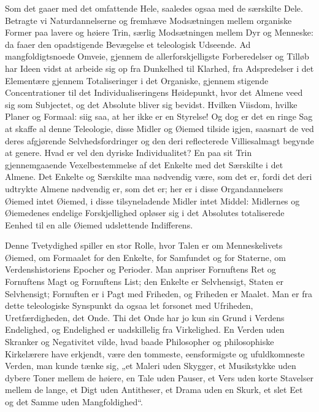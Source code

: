 \documentclass[12pt]{book}
\begin{document}
Som det gaaer med det omfattende Hele, saaledes ogsaa med de
særskilte Dele. Betragte vi Naturdannelserne og fremhæve
Modsætningen mellem organiske Former paa lavere og høiere Trin,
særlig Modsætningen mellem Dyr og Menneske: da faaer den opadstigende
Bevægelse et teleologisk Udseende. Ad mangfoldigtsnoede Omveie,
gjennem de allerforskjelligste Forberedelser og Tilløb har Ideen
vidst at arbeide sig op fra Dunkelhed til Klarhed, fra Adspredelser
i det Elementære gjennem Totaliseringer i det Organiske, gjennem
stigende Concentrationer til det Individualiseringens Høidepunkt,
hvor det Almene veed sig som Subjectet, og det Absolute bliver sig
bevidst. Hvilken Viisdom, hvilke Planer og Formaal: siig saa, at her
ikke er en Styrelse! Og dog er det en ringe Sag at skaffe al denne
Teleologie, disse Midler og Øiemed tilside igjen, saasnart de ved
deres afgjørende Selvhedsfordringer og den deri reflecterede
Villiesalmagt begynde at genere. Hvad er vel den dyriske
Individualitet? En paa sit Trin gjennemgaaende Vexelbestemmelse af
det Enkelte med det Særskilte i det Almene. Det Enkelte og Særskilte
maa nødvendig være, som det er, fordi det deri udtrykte Almene
nødvendig er, som det er; her er i disse Organdannelsers Øiemed
intet Øiemed, i disse tilsyneladende Midler intet Middel: Midlernes
og Øiemedenes endelige Forskjellighed opløser sig i det Absolutes
totaliserede Eenhed til en alle Øiemed udslettende Indifferens.

Denne Tvetydighed spiller en stor Rolle, hvor Talen er om
Menneskelivets Øiemed, om Formaalet for den
Enkelte, for Samfundet og for Staterne, om Verdenshistoriens Epocher
og Perioder. Man anpriser Fornuftens Ret og Fornuftens Magt og
Fornuftens List; den Enkelte er Selvhensigt, Staten er Selvhensigt;
Fornuften er i Pagt med Friheden, og Friheden er Maalet. Man er fra
dette teleologiske Synspunkt da ogsaa let forsonet med Ufriheden,
Uretfærdigheden, det Onde. Thi det Onde har jo kun sin Grund i
Verdens Endelighed, og Endelighed er uadskillelig fra Virkelighed.
En Verden uden Skranker og Negativitet vilde, hvad baade Philosopher
og philosophiske Kirkelærere have erkjendt, være den tommeste,
eensformigste og ufuldkomneste Verden, man kunde tænke sig, „et
Maleri uden Skygger, et Musikstykke uden dybere Toner mellem de
høiere, en Tale uden Pauser, et Vers uden korte Stavelser mellem de
lange, et Digt uden Antitheser, et Drama uden en Skurk, et slet Eet
og det Samme uden Mangfoldighed“.
\end{document}
